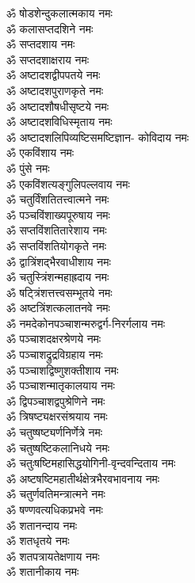 \begin{multicols}{2}
\begin{flushleft}
ॐ षोडशेन्दुकलात्मकाय नमः\\
ॐ कलासप्तदशिने नमः\\
ॐ सप्तदशाय नमः\\
ॐ सप्तदशाक्षराय नमः\\
ॐ अष्टादशद्वीपपतये नमः\\
ॐ अष्टादशपुराणकृते नमः\hfill{}\\
ॐ अष्टादशौषधीसृष्टये नमः\\
ॐ अष्टादशविधिस्मृताय नमः\\
ॐ अष्टादशलिपिव्यष्टिसमष्टिज्ञान- कोविदाय नमः\\
ॐ एकविंशाय नमः\\
ॐ पुंसे नमः\\
ॐ एकविंशत्यङ्गुलिपल्लवाय नमः\\
ॐ चतुर्विंशतितत्त्वात्मने नमः\\
ॐ पञ्चविंशाख्यपूरुषाय नमः\\
ॐ सप्तविंशतितारेशाय नमः\\
ॐ सप्तविंशतियोगकृते नमः\hfill{}\\
ॐ द्वात्रिंशद्भैरवाधीशाय नमः\\
ॐ चतुस्त्रिंशन्महाह्रदाय नमः\\
ॐ षट्त्रिंशत्तत्त्वसम्भूतये नमः\\
ॐ अष्टत्रिंशत्कलातनवे नमः\\
ॐ नमदेकोनपञ्चाशन्मरुद्वर्ग-निरर्गलाय नमः\\
ॐ पञ्चाशदक्षरश्रेणये नमः\\
ॐ पञ्चाशद्रुद्रविग्रहाय नमः\\
ॐ पञ्चाशद्विष्णुशक्तीशाय नमः\\
ॐ पञ्चाशन्मातृकालयाय नमः\\
ॐ द्विपञ्चाशद्वपुश्रेणिने नमः\hfill{}\\
ॐ त्रिषष्ट्यक्षरसंश्रयाय नमः\\
ॐ चतुष्षष्ट्यर्णनिर्णेत्रे नमः\\
ॐ चतुष्षष्टिकलानिधये नमः\\
ॐ चतुःषष्टिमहासिद्धयोगिनी-वृन्दवन्दिताय नमः\\
ॐ अष्टषष्टिमहातीर्थक्षेत्रभैरवभावनाय नमः\\
ॐ चतुर्णवतिमन्त्रात्मने नमः\\
ॐ षण्णवत्यधिकप्रभवे नमः\\
ॐ शतानन्दाय नमः\\
ॐ शतधृतये नमः\\
ॐ शतपत्रायतेक्षणाय नमः\hfill{}\\
ॐ शतानीकाय नमः\\

\end{flushleft}
\end{multicols}
